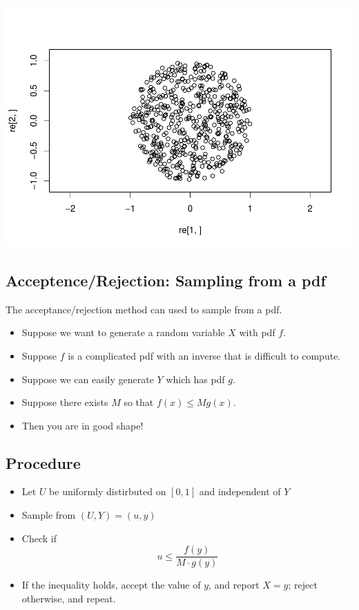\documentclass[
]{article}
\providecommand{\tightlist}{%
  \setlength{\itemsep}{0pt}\setlength{\parskip}{0pt}}
\theoremstyle{definition}
\theoremstyle{definition}
\theoremstyle{definition}
\theoremstyle{remark}
\begin{document}
\includegraphics{randomTP_files/figure-latex/unnamed-chunk-3-1.pdf}

\hypertarget{acceptencerejection-sampling-from-a-pdf}{%
\subsection{Acceptence/Rejection: Sampling from a pdf}\label{acceptencerejection-sampling-from-a-pdf}}

The acceptance/rejection method can used to sample from a pdf.

\begin{itemize}
\item
  Suppose we want to generate a random variable \(X\) with pdf \(f\).
\item
  Suppose \(f\) is a complicated pdf with an inverse that is difficult to compute.
\item
  Suppose we can easily generate \(Y\) which has pdf \(g\).
\item
  Suppose there exists \(M\) so that \(f(x) \leq M g(x)\).
\item
  Then you are in good shape!
\end{itemize}

\hypertarget{procedure}{%
\subsection{Procedure}\label{procedure}}

\begin{itemize}
\tightlist
\item
  Let \(U\) be uniformly distirbuted on \([0,1]\) and independent of \(Y\)
\item
  Sample from \((U, Y) = (u, y)\)
\item
  Check if
  \[ u \leq  \frac{f(y)}{M \cdot g(y)}\]
\item
  If the inequality holds, accept the value of \(y\), and report \(X=y\); reject otherwise, and repeat.
\end{itemize}
\end{document}
